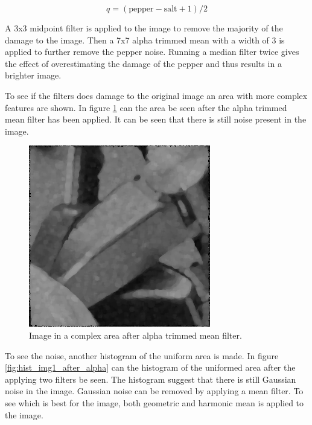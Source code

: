 \begin{equation}
 q = (\text{pepper}-\text{salt}+1)/2 \label{eq:quantile}
\end{equation}

A 3x3 midpoint filter is applied to the image to remove the majority of the damage to the image.
Then a 7x7 alpha trimmed mean with a width of 3 is applied to further remove the pepper noise.
Running a median filter twice gives the effect of overestimating the damage of the pepper and thus results in a brighter image.

To see if the filters does damage to the original image an area with more complex features are shown.
In figure \ref{fig:complex1_after_alpha} can the area be seen after the alpha trimmed mean filter has been applied.
It can be seen that there is still noise present in the image.

\begin{figure}[H]
\centering
\includegraphics[width = \cutOutWidth]{graphics/complex1_step2}
\caption{Image in a complex area after alpha trimmed mean filter.}
\label{fig:complex1_after_alpha}
\end{figure}

To see the noise, another histogram of the uniform area is made.
In figure \ref{fig:hist_img1_after_alpha} can the histogram of the uniformed area after the applying two filters be seen.
The histogram suggest that there is still Gaussian noise in the image.
Gaussian noise can be removed by applying a mean filter.
To see which is best for the image, both geometric and harmonic mean is applied to the image.

